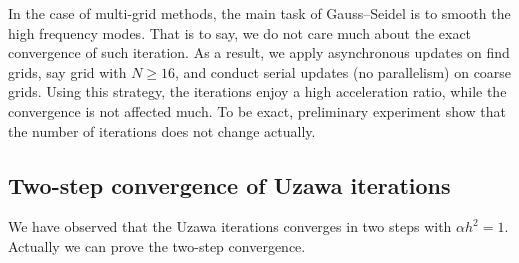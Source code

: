 \documentclass[english, nochinese]{pnote}
\begin{document}
In the case of multi-grid methods, the main task of Gauss--Seidel is to smooth the high frequency modes. That is to say, we do not care much about the exact convergence of such iteration. As a result, we apply asynchronous updates on find grids, say grid with $ N \ge 16 $, and conduct serial updates (no parallelism) on coarse grids. Using this strategy, the iterations enjoy a high acceleration ratio, while the convergence is not affected much. To be exact, preliminary experiment show that the number of iterations does not change actually.

\subsection{Two-step convergence of Uzawa iterations} \label{SubSec:Uzawa}

We have observed that the Uzawa iterations converges in two steps with $ \alpha h^2 = 1 $. Actually we can prove the two-step convergence.
\end{document}
